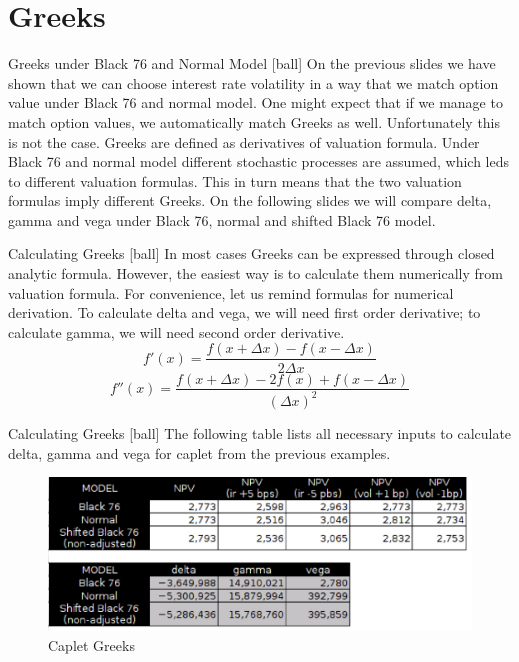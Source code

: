 \documentclass{beamer}
\begin{document}
\section{Greeks}

\begin{frame}{Greeks under Black 76 and Normal Model}
[ball]
On the previous slides we have shown that we can choose interest rate volatility in a way that we match option value under Black 76 and normal model. One might expect that if we manage to match option values, we automatically match Greeks as well. Unfortunately this is not the case. Greeks are defined as derivatives of valuation formula. Under Black 76 and normal model different stochastic processes are assumed, which leds to different valuation formulas. This in turn means that the two valuation formulas imply different Greeks. On the following slides we will compare delta, gamma and vega under Black 76, normal and shifted Black 76 model. 
\end{frame}

\begin{frame}{Calculating Greeks}
[ball]
In most cases Greeks can be expressed through closed analytic formula. However, the easiest way is to calculate them numerically from valuation formula. For convenience, let us remind formulas for numerical derivation. To calculate delta and vega, we will need first order derivative; to calculate gamma, we will need second order derivative.
\begin{equation}
f'(x) = \frac{f(x + \Delta x) - f(x - \Delta x)}{2 \Delta x}
\end{equation}
\begin{equation}
f''(x) = \frac{f(x + \Delta x) - 2f(x) + f(x - \Delta x)}{(\Delta x)^2}
\end{equation}
\end{frame}

\begin{frame}{Calculating Greeks}
[ball]
The following table lists all necessary inputs to calculate delta, gamma and vega for caplet from the previous examples.
\begin{figure}[htp]
\centering
\includegraphics[scale = 0.50]{greeks.eps}
\caption{Caplet Greeks}
\label{greeks}
\end{figure} 
\end{frame}
\end{document}
